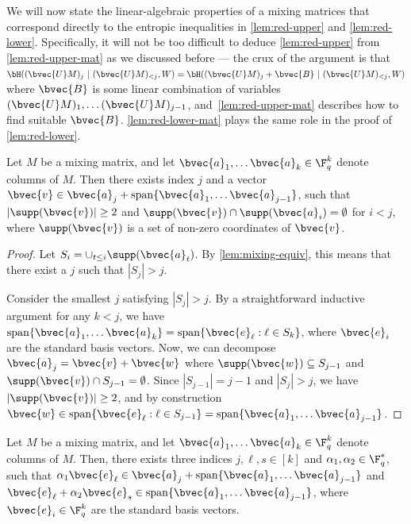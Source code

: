 \documentclass[11pt]{article}
\begin{document}
We will now state the linear-algebraic properties of a mixing matrices that correspond directly to the entropic inequalities in \cref{lem:red-upper} and \cref{lem:red-lower}. Specifically, it will not be too difficult to deduce \cref{lem:red-upper} from \cref{lem:red-upper-mat} as we discussed before --- the crux of the argument is that $\bH((\bvec{U} M)_{j} ~|~ (\bvec{U}M)_{< j}, W) = \bH((\bvec{U} M)_j + \bvec{B} ~|~ (\bvec{U} M)_{<j}, W)$ where $\bvec{B}$ is some linear combination of variables $(\bvec{U} M)_{1}, \ldots (\bvec{U} M)_{j-1}$, and~\cref{lem:red-upper-mat} describes how to find suitable $\bvec{B}$. \cref{lem:red-lower-mat} plays the same role in the proof of \cref{lem:red-lower}.

\begin{lemma}
	\label{lem:red-upper-mat}
	Let $M$ be a mixing matrix, and let $\bvec{a}_1, \ldots \bvec{a}_k \in \F_q^k$ denote columns of $M$. Then there exists index $j$ and a vector $\bvec{v} \in \bvec{a}_j + \mathrm{span}\{\bvec{a}_1, \ldots \bvec{a}_{j-1}\}$, such that $|\supp(\bvec{v})| \geq 2$ and $\supp(\bvec{v}) \cap \supp(\bvec{a}_i) = \emptyset$ for $i < j$, where $\supp(\bvec{v})$ is a set of non-zero coordinates of $\bvec{v}$.
\end{lemma}
\begin{proof}
	Let $S_i = \cup_{t \leq i} \supp(\bvec{a}_t)$. By \cref{lem:mixing-equiv}, this means that there exist a $j$ such that $|S_j|>j$.
	
	Consider the smallest $j$ satisfying $|S_j| > j$.  By a straightforward inductive argument for any $k <j$, we have $\mathrm{span}\{\bvec{a}_1, \ldots \bvec{a}_{k} \} = \mathrm{span} \{ \bvec{e}_\ell : \ell \in S_{k} \}$, where $\bvec{e}_i$ are the standard basis vectors. Now, we can decompose $\bvec{a}_j = \bvec{v} + \bvec{w}$ where $\supp(\bvec{w}) \subseteq S_{j-1}$ and $\supp(\bvec{v}) \cap S_{j-1} = \emptyset$. Since $|S_{j-1}| = j-1$ and $|S_{j}| > j$, we have $|\supp(\bvec{v})| \geq  2$, and by construction $\bvec{w} \in \mathrm{span}\{\bvec{e}_\ell : \ell \in S_{j-1}\} = \mathrm{span}\{\bvec{a}_1, \ldots \bvec{a}_{j-1}\}$.
\end{proof}
\begin{lemma}
	\label{lem:red-lower-mat}
	Let $M$ be a mixing matrix, and let $\bvec{a}_1, \ldots \bvec{a}_k \in \F_q^k$ denote columns of $M$. Then, there exists three indices $j,\ell,s \in [k]$ and $\alpha_1, \alpha_2 \in \F_q^*$, such that $\alpha_1 \bvec{e}_\ell \in \bvec{a}_j + \mathrm{span}\{\bvec{a}_1, \ldots \bvec{a}_{j-1}\}$ and $\bvec{e}_\ell + \alpha_2 \bvec{e}_s \in \mathrm{span}\{\bvec{a}_1, \ldots \bvec{a}_{j-1}\}$, where $\bvec{e}_i \in \F_q^k$ are the standard basis vectors.
\end{lemma}
\end{document}
